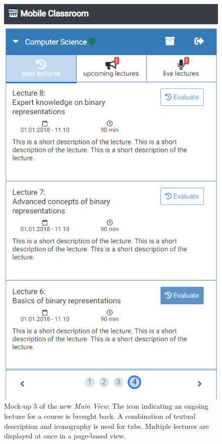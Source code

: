 \begin{figure}[ht]
	\begin{minipage}[t]{\textwidth}
		\centering
		\includegraphics[width=.7\textwidth]{mockups/main_view_enhancement_v3.png}
		\captionsetup{width=.8\linewidth}
		\caption{Mock-up 3 of the new \emph{Main View}:
			The icon indicating an ongoing lecture for a course is brought back.
			A combination of textual description and iconography is used for tabs.
			Multiple lectures are displayed at once in a page-based view.
		}
		\label{figure:mainviewenhancement3}
	\end{minipage}
\end{figure}

